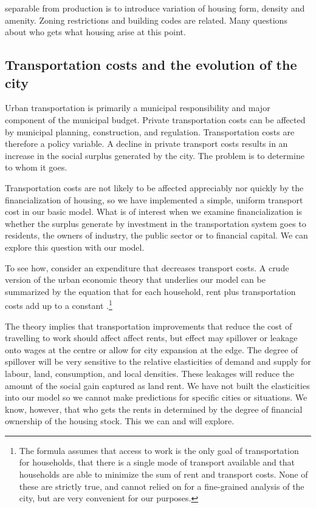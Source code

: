separable from production is to introduce variation of housing form,  density and amenity. Zoning restrictions and building codes are related. Many questions about who gets what housing arise at this point. 

\subsection{Transportation costs and the evolution of the city} \label{section-transportation}

Urban transportation is primarily a municipal responsibility and major component of the municipal budget. Private transportation costs can be affected by municipal planning, construction, and regulation. Transportation costs are therefore a policy variable.  A decline in private transport costs results in an increase in the social surplus generated by the city. The problem is to determine to whom it goes. 

Transportation costs are not likely to be affected appreciably nor quickly by the financialization of housing,
so we have implemented a simple, uniform transport cost in our basic model. What is of interest when we examine financialization is whether the surplus generate by investment in the transportation system goes to residents, the owners of industry, the public sector or to financial capital. We can explore this question with our model. 

To see how, consider an expenditure that decreases transport costs.  A crude version of the urban economic theory  that underlies our  model can be summarized by the equation that for each household, rent plus transportation costs add up to a constant \cite{sootTransportationCostsUrban1974c}.\footnote{The formula assumes that access to work is the only goal of transportation for households, that there is a single mode of transport available and that households are able to minimize the sum of rent and transport costs. None of these are strictly true, and cannot relied on for a fine-grained analysis of the city, but are very convenient for our purposes.} %


The theory implies that transportation improvements that reduce the cost of travelling to work should  affect affect rents, but effect may spillover or leakage  onto wages  at the centre or allow for city expansion at the edge.   The degree of spillover will be very sensitive to the relative elasticities of demand and supply  for labour, land, consumption, and local densities. These leakages will reduce the amount of the social gain captured as land rent. We  have not built the elasticities into our model so we cannot make predictions for specific cities or situations. We know, however, that who gets the rents in determined by the degree of financial ownership of  the housing stock. This we can and will explore. 

